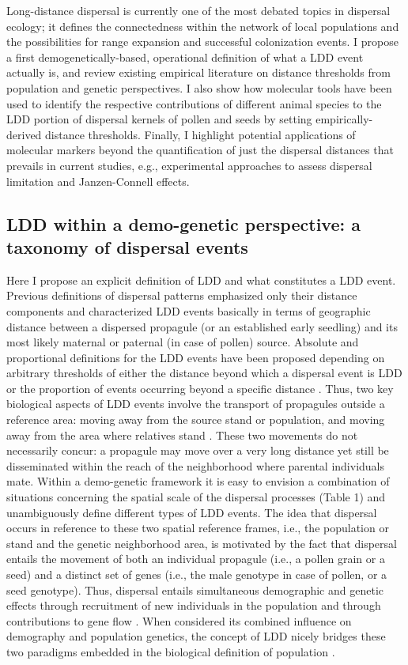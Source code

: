 \documentclass[a4paper, 12pt]{article}
\begin{document}
\begin{linenumbers}
Long-distance dispersal is currently one of the most debated topics in dispersal ecology; it defines the connectedness within the network of local populations and the possibilities for range expansion and successful colonization events. I propose a first demogenetically-based, operational definition of what a LDD event actually is, and review existing empirical literature on distance thresholds from population and genetic perspectives. I also show how molecular tools have been used to identify the respective contributions of different animal species to the LDD portion of dispersal kernels of pollen and seeds by setting empirically-derived distance thresholds. Finally, I highlight potential applications of molecular markers beyond the quantification of just the dispersal distances that prevails in current studies, e.g., experimental approaches to assess dispersal limitation and Janzen-Connell effects.


\subsection*{LDD within a demo-genetic perspective: a taxonomy of dispersal events}

Here I propose an explicit definition of LDD and what constitutes a LDD event. Previous definitions of dispersal patterns emphasized only their distance components and characterized LDD events basically in terms of geographic distance between a dispersed propagule (or an established early seedling) and its most likely maternal or paternal (in case of pollen) source. Absolute and proportional definitions for the LDD events have been proposed depending on arbitrary thresholds of either the distance beyond which a dispersal event is LDD or the proportion of events occurring beyond a specific distance \citep{Nathan:2005jc, Nathan:2008is}. Thus, two key biological aspects of LDD events involve the transport of propagules outside a reference area: moving away from the source stand or population, and moving away from the area where relatives stand \citep{Kinlan:2005fb}. These two movements do not necessarily concur: a propagule may move over a very long distance yet still be disseminated within the reach of the neighborhood where parental individuals mate. Within a demo-genetic framework it is easy to envision a combination of situations concerning the spatial scale of the dispersal processes (Table 1) and unambiguously define different types of LDD events. The idea that dispersal occurs in reference to these two spatial reference frames, i.e., the population or stand and the genetic neighborhood area, is motivated by the fact that dispersal entails the movement of both an individual propagule (i.e., a pollen grain or a seed) and a distinct set of genes (i.e., the male genotype in case of pollen, or a seed genotype). Thus, dispersal entails simultaneous demographic and genetic effects through recruitment of new individuals in the population and through contributions to gene flow \citep{Harper:1977aa}. When considered its combined influence on demography and population genetics, the concept of LDD nicely bridges these two paradigms embedded in the biological definition of population \citep{Waples:2006ev}. 
 

\end{linenumbers}
\end{document}
